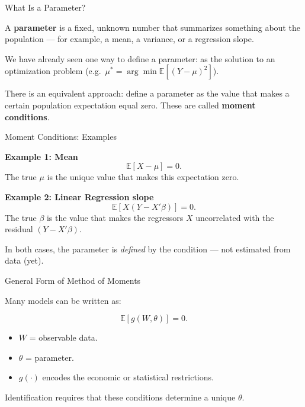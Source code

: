 \documentclass[aspectratio=169, handout, t]{beamer}
\numberwithin{equation}{section}
\begin{document}
\begin{frame}{What Is a Parameter?}

A \textbf{parameter} is a fixed, unknown number that summarizes something about the population --- for example, a mean, a variance, or a regression slope.\pause

\vspace{0.3cm}

We have already seen one way to define a parameter: as the solution to an optimization problem (e.g.\ $\mu^* = \arg\min \mathbb{E}[(Y-\mu)^2]$).\pause

\vspace{0.3cm}

There is an equivalent approach: define a parameter as the value that makes a certain population expectation equal zero. These are called \textbf{moment conditions}.

\end{frame}


\begin{frame}{Moment Conditions: Examples}

\textbf{Example 1: Mean}
\[
\mathbb{E}[X - \mu] = 0.
\]
The true $\mu$ is the unique value that makes this expectation zero.\pause

\vspace{0.4cm}

\textbf{Example 2: Linear Regression slope}
\[
\mathbb{E}\left[X (Y - X'\beta)\right] = 0.
\]
The true $\beta$ is the value that makes the regressors $X$ uncorrelated with the residual $(Y-X'\beta).$\pause

\vspace{0.4cm}

In both cases, the parameter is \emph{defined} by the condition --- not estimated from data (yet).

\end{frame}

\begin{frame}{General Form of Method of Moments}

Many models can be written as:

\[
\mathbb{E}[g(W, \theta)] = 0.
\]

\vspace{0.3cm}

\begin{itemize}
    \item $W$ = observable data.
    \item $\theta$ = parameter.
    \item $g(\cdot)$ encodes the economic or statistical restrictions.
\end{itemize}

\vspace{0.4cm}

Identification requires that these conditions determine a unique $\theta$.
\end{frame}
\end{document}
